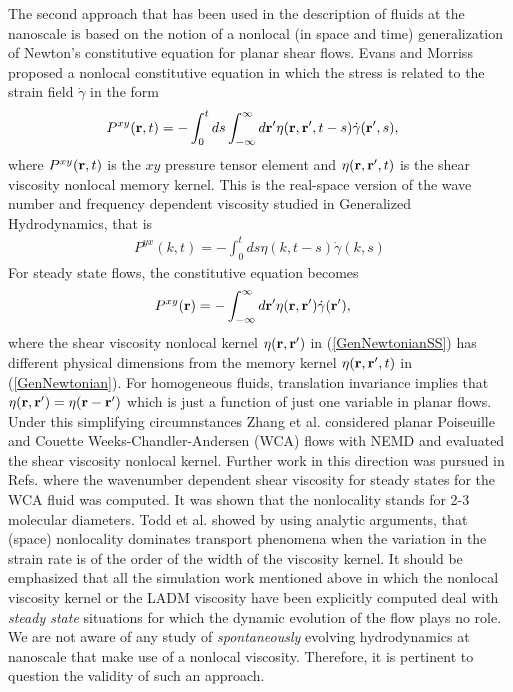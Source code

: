 \documentclass[b5paper,openright,10pt]{book}
\begin{document}
The second approach that has been used in the description of fluids at
the nanoscale  is based  on the  notion of a  nonlocal (in  space and
time)  generalization of  Newton's  constitutive  equation for  planar
shear  flows. Evans and Morriss \cite{EvansMorriss2008} proposed a nonlocal constitutive equation in  which  the  stress is  related  to  the strain  field $\dot{\gamma}$ in the form
\begin{align}
  P^{xy}({\bf r},t)&=-\int_0^t ds \int_{-\infty}^{\infty} d{\bf r}'
\eta({\bf r},{\bf r}',t-s)\dot{\gamma}({\bf r}',s),
\label{GenNewtonian}   %
\end{align}
where  $P^{xy}({\bf r}, t)$ is the $xy$ pressure tensor element and $\eta({\bf r},{\bf  r}',t)$  is the  shear viscosity  nonlocal
memory kernel.  This is the real-space  version of the wave number and
frequency     dependent    viscosity \cite{EvansMorriss2008}     studied    in     Generalized
Hydrodynamics, that is 
\begin{align}
  P^{yx}(k,t) = -\int_0^t ds\eta(k,t-s)\dot{\gamma}(k,s)
\end{align}
For  steady  state flows,  the  constitutive  equation
becomes
\begin{align}
  P^{xy}({\bf r})&=-\int_{-\infty}^{\infty} d{\bf r}'
\eta({\bf r},{\bf r}')\dot{\gamma}({\bf r}'),
\label{GenNewtonianSS}
\end{align}
where the shear viscosity nonlocal kernel $\eta({\bf r},{\bf r}')$ in
(\ref{GenNewtonianSS})  has  different  physical dimensions  from  the
memory kernel $\eta({\bf r},{\bf r}',t)$ in (\ref{GenNewtonian}).  For
homogeneous  fluids, translation  invariance  implies that  $\eta({\bf
  r},{\bf r}')=\eta({\bf  r}-{\bf r}')$  which is  just a  function of
just   one  variable   in  planar   flows.   Under   this  simplifying
circumnstances  Zhang  et   al.   \cite{Zhang2004}  considered  planar
Poiseuille  and  Couette  Weeks-Chandler-Andersen (WCA) flows  with NEMD  and  evaluated  the  shear
viscosity  nonlocal kernel.  Further  work in
this        direction        was        pursued        in        Refs.
\cite{Hansen2007,Todd2008a,Cadusch2008}    where    the    wavenumber
dependent  shear viscosity  for steady  states for  the WCA fluid was
computed. It was shown that  the nonlocality stands for 2-3 molecular
diameters.   Todd et  al.   \cite{Todd2008} showed  by using  analytic
arguments, that (space) nonlocality dominates transport phenomena when
the variation in the  strain rate is of the order of  the width of the
viscosity kernel.
It should be  emphasized that all the simulation  work mentioned above
in which  the nonlocal  viscosity kernel or  the LADM  viscosity have
been explicitly  computed deal  with \textit{steady  state} situations
for which the dynamic evolution of the  flow plays no role. We are not
aware of any study of \textit{spontaneously} evolving hydrodynamics at
nanoscale that  make use  of a nonlocal  viscosity. Therefore,  it is
pertinent to question the validity of such an approach.
\end{document}
